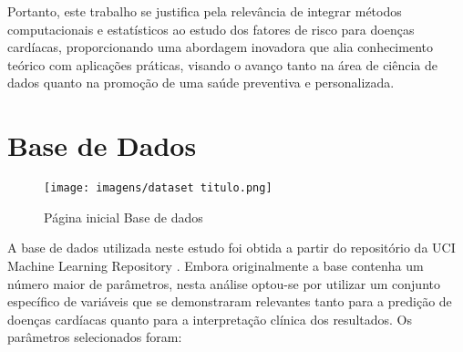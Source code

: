 \documentclass[conference]{IEEEtran}
\begin{document}
Portanto, este trabalho se justifica pela relevância de integrar métodos computacionais e estatísticos ao estudo dos fatores de risco para doenças cardíacas, proporcionando uma abordagem inovadora que alia conhecimento teórico com aplicações práticas, visando o avanço tanto na área de ciência de dados quanto na promoção de uma saúde preventiva e personalizada.

\section{Base de Dados}
\begin{figure}[htbp]
    \centering
    \texttt{[image: imagens/dataset titulo.png]}
    \caption{Página inicial Base de dados}
    \label{capa}
\end{figure}
A base de dados utilizada neste estudo foi obtida a partir do repositório da UCI Machine Learning Repository \cite{Dataset}. Embora originalmente a base contenha um número maior de parâmetros, nesta análise optou-se por utilizar um conjunto específico de variáveis que se demonstraram relevantes tanto para a predição de doenças cardíacas quanto para a interpretação clínica dos resultados. Os parâmetros selecionados foram:
\end{document}
